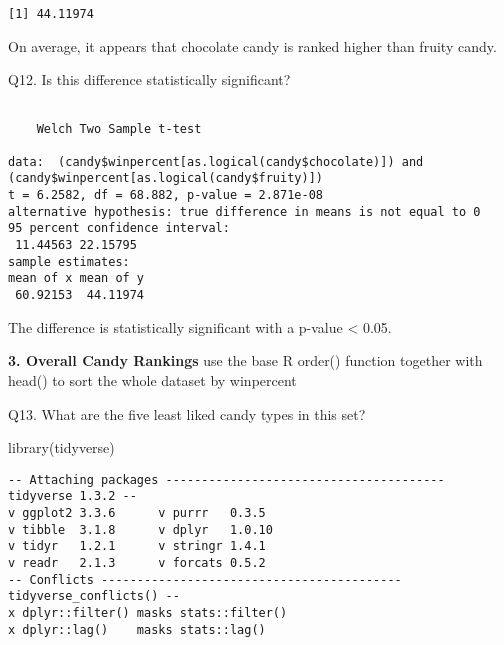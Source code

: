 \documentclass[
  letterpaper,
  DIV=11,
  numbers=noendperiod]{scrartcl}
\newenvironment{Shaded}{\begin{snugshade}}{\end{snugshade}}
\newcommand{\AttributeTok}[1]{\textcolor[rgb]{0.40,0.45,0.13}{#1}}
\newcommand{\FunctionTok}[1]{\textcolor[rgb]{0.28,0.35,0.67}{#1}}
\newcommand{\NormalTok}[1]{\textcolor[rgb]{0.00,0.23,0.31}{#1}}
\newcommand{\SpecialCharTok}[1]{\textcolor[rgb]{0.37,0.37,0.37}{#1}}
\begin{document}
\begin{verbatim}
[1] 44.11974
\end{verbatim}

On average, it appears that chocolate candy is ranked higher than fruity
candy.

Q12. Is this difference statistically significant?

\begin{Shaded}
\end{Shaded}

\begin{verbatim}

    Welch Two Sample t-test

data:  (candy$winpercent[as.logical(candy$chocolate)]) and (candy$winpercent[as.logical(candy$fruity)])
t = 6.2582, df = 68.882, p-value = 2.871e-08
alternative hypothesis: true difference in means is not equal to 0
95 percent confidence interval:
 11.44563 22.15795
sample estimates:
mean of x mean of y 
 60.92153  44.11974 
\end{verbatim}

The difference is statistically significant with a p-value \textless{}
0.05.

\textbf{3. Overall Candy Rankings} use the base R order() function
together with head() to sort the whole dataset by winpercent

Q13. What are the five least liked candy types in this set?

\begin{Shaded}
\begin{Highlighting}[]
\FunctionTok{library}\NormalTok{(tidyverse)}
\end{Highlighting}
\end{Shaded}

\begin{verbatim}
-- Attaching packages --------------------------------------- tidyverse 1.3.2 --
v ggplot2 3.3.6      v purrr   0.3.5 
v tibble  3.1.8      v dplyr   1.0.10
v tidyr   1.2.1      v stringr 1.4.1 
v readr   2.1.3      v forcats 0.5.2 
-- Conflicts ------------------------------------------ tidyverse_conflicts() --
x dplyr::filter() masks stats::filter()
x dplyr::lag()    masks stats::lag()
\end{verbatim}
\end{document}
